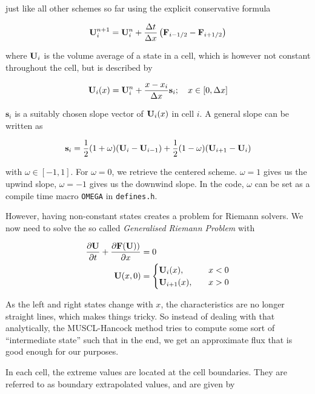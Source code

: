just like all other schemes so far using the explicit conservative formula

\begin{equation}
	\mathbf{U}_i^{n+1} = \mathbf{U}_i^n + \frac{\Delta t}{\Delta x} \left( \mathbf{F}_{i-1/2} - \mathbf{F}_{i + 1/2} \right)
\end{equation}

where $\mathbf{U}_i$ is the volume average of a state in a cell, which is however not constant throughout the cell, but is described by

\begin{equation}
	\mathbf{U}_{i}(x) = \mathbf{U}_i^n + \frac{x - x_i}{\Delta x} \mathbf{s}_i; \quad x \in [0, \Delta x]
\end{equation}


$\mathbf{s}_i$ is a suitably chosen slope vector of $\mathbf{U}_i(x)$ in cell $i$.
A general slope can be written as

\begin{equation}
 	\mathbf{s}_i = \frac{1}{2} (1 + \omega) (\mathbf{U}_i - \mathbf{U}_{i-1}) + \frac{1}{2} (1 - \omega) (\mathbf{U}_{i+1} - \mathbf{U}_i)
\end{equation}

with $\omega \in [-1, 1]$.
For $\omega = 0$, we retrieve the centered scheme.
$\omega = 1$ gives us the upwind slope, $\omega = -1$ gives us the downwind slope.
In the code, $\omega$ can be set as a compile time macro \texttt{OMEGA} in \texttt{defines.h}.


However, having non-constant states creates a problem for Riemann solvers.
We now need to solve the so called \emph{Generalised Riemann Problem} with

\begin{align}
	\frac{\partial \mathbf{U}}{\partial t} + \frac{\partial \mathbf{F}(\mathbf{U}))}{\partial x} &= 0 \\
	\mathbf{U}(x, 0) &=
	\begin{cases}
		\mathbf{U}_i(x), & \quad x < 0 \\
		\mathbf{U}_{i+1}(x), & \quad x > 0 \\
	\end{cases}
\end{align}

As the left and right states change with $x$, the characteristics are no longer straight lines, which makes things tricky.
So instead of dealing with that analytically, the MUSCL-Hancock method tries to compute some sort of ``intermediate state'' such that in the end, we get an approximate flux that is good enough for our purposes.

In each cell, the extreme values are located at the cell boundaries.
They are referred to as boundary extrapolated values, and are given by

